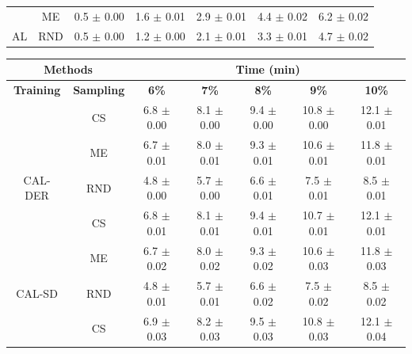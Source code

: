\begin{table}[htbp]
\begin{tabular*}{\linewidth}{c|c|@{\extracolsep{\fill}}ccccc}
 & ME & 0.5 $\pm$ {\small 0.00} & 1.6 $\pm$ {\small 0.01} & 2.9 $\pm$ {\small 0.01} & 4.4 $\pm$ {\small 0.02} & 6.2 $\pm$ {\small 0.02}\\

\multirow{-3}{*}{\raggedright\arraybackslash AL} & RND & 0.5 $\pm$ {\small 0.00} & 1.2 $\pm$ {\small 0.00} & 2.1 $\pm$ {\small 0.01} & 3.3 $\pm$ {\small 0.01} & 4.7 $\pm$ {\small 0.02}\\
\bottomrule
\end{tabular*}
\vspace{0.5em}

\begin{tabular*}{\linewidth}{c|c|@{\extracolsep{\fill}}ccccc}
\toprule
\multicolumn{2}{c|}{\textbf{Methods}} & \multicolumn{5}{c}{\textbf{Time (min)}} \\
\midrule
\textbf{Training} & \textbf{Sampling} & \textbf{6\%} & \textbf{7\%} & \textbf{8\%} & \textbf{9\%} & \textbf{10\%}\\
\midrule
 & CS & 6.8 $\pm$ {\small 0.00} & 8.1 $\pm$ {\small 0.00} & 9.4 $\pm$ {\small 0.00} & 10.8 $\pm$ {\small 0.00} & 12.1 $\pm$ {\small 0.01}\\

 & ME & 6.7 $\pm$ {\small 0.01} & 8.0 $\pm$ {\small 0.01} & 9.3 $\pm$ {\small 0.01} & 10.6 $\pm$ {\small 0.01} & 11.8 $\pm$ {\small 0.01}\\

\multirow{-3}{*}{\raggedright\arraybackslash CAL-DER} & RND & 4.8 $\pm$ {\small 0.00} & 5.7 $\pm$ {\small 0.00} & 6.6 $\pm$ {\small 0.01} & 7.5 $\pm$ {\small 0.01} & 8.5 $\pm$ {\small 0.01}\\
\midrule
 & CS & 6.8 $\pm$ {\small 0.01} & 8.1 $\pm$ {\small 0.01} & 9.4 $\pm$ {\small 0.01} & 10.7 $\pm$ {\small 0.01} & 12.1 $\pm$ {\small 0.01}\\

 & ME & 6.7 $\pm$ {\small 0.02} & 8.0 $\pm$ {\small 0.02} & 9.3 $\pm$ {\small 0.02} & 10.6 $\pm$ {\small 0.03} & 11.8 $\pm$ {\small 0.03}\\

\multirow{-3}{*}{\raggedright\arraybackslash CAL-SD} & RND & 4.8 $\pm$ {\small 0.01} & 5.7 $\pm$ {\small 0.01} & 6.6 $\pm$ {\small 0.02} & 7.5 $\pm$ {\small 0.02} & 8.5 $\pm$ {\small 0.02}\\
\midrule
 & CS & 6.9 $\pm$ {\small 0.03} & 8.2 $\pm$ {\small 0.03} & 9.5 $\pm$ {\small 0.03} & 10.8 $\pm$ {\small 0.03} & 12.1 $\pm$ {\small 0.04}\\


\end{tabular*}
\end{table}
